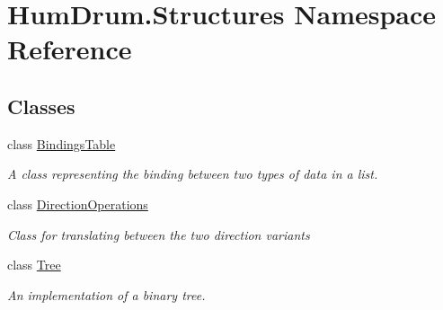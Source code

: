 \hypertarget{namespaceHumDrum_1_1Structures}{}\section{Hum\+Drum.\+Structures Namespace Reference}
\label{namespaceHumDrum_1_1Structures}
\subsection*{Classes}
\begin{DoxyCompactItemize}
\item 
class \hyperlink{classHumDrum_1_1Structures_1_1BindingsTable}{Bindings\+Table}
\begin{DoxyCompactList}\small\item\em A class representing the binding between two types of data in a list. \end{DoxyCompactList}\item 
class \hyperlink{classHumDrum_1_1Structures_1_1DirectionOperations}{Direction\+Operations}
\begin{DoxyCompactList}\small\item\em Class for translating between the two direction variants \end{DoxyCompactList}\item 
class \hyperlink{classHumDrum_1_1Structures_1_1Tree}{Tree}
\begin{DoxyCompactList}\small\item\em An implementation of a binary tree. \end{DoxyCompactList}\end{DoxyCompactItemize}
